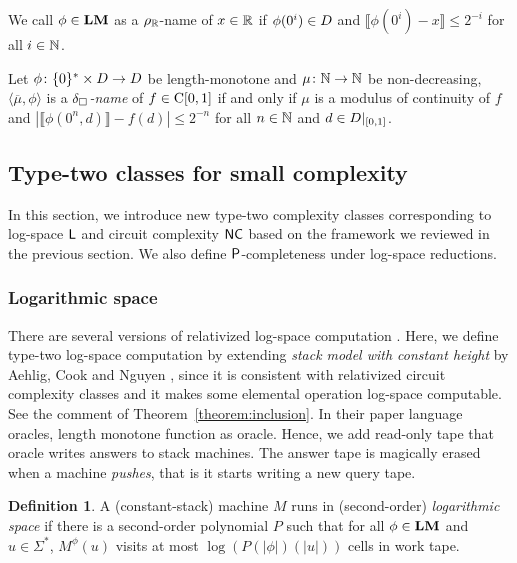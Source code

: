 \documentclass{article}
\theoremstyle{definition}
\newtheorem{definition}[theorem]{Definition}
\theoremstyle{remark}
\begin{document}
We call $\phi \in \mathbf{LM}$ as a $\rho _\mathbb R$-name of $x \in \mathbb R$ 
if $\phi(0^i) \in D$ and $\llbracket \phi(0^i) - x \rrbracket \le 2^{-i}$
for all $i \in \mathbb N$.

Let $\phi \colon \{0\}^* \times D \to D$ be length-monotone and $\mu \colon \mathbb N \to \mathbb N$ be non-decreasing,
$\langle \overline{\mu}, \phi \rangle$ is a {\em $\delta _\square$-name} of $f \in \mathrm C[0,1]$
if and only if $\mu$ is a modulus of continuity of $f$
and $|\llbracket \phi(0^n, d) \rrbracket - f(d)| \le 2^{-n}$ for all $n \in \mathbb N$ and $d \in D|_{[0,1]}$.




\subsection{Type-two classes for small complexity}
\label{section:small-classes}

In this section, we introduce new type-two complexity classes
corresponding to log-space $\mathsf{L}$ and circuit complexity $\mathsf{NC}$
based on the framework we reviewed in the previous section.
We also define $\mathsf{P}$-completeness under log-space reductions.

\subsubsection{Logarithmic space}
There are several versions of relativized log-space computation
\cite{aehlig2007relativizing,buss1988relativized,ladner1976relativization,wilson1988measure, ota2013logspace}.
Here, we define type-two log-space computation 
by extending \emph{stack model with constant height} by Aehlig, Cook and Nguyen 
\cite{aehlig2007relativizing},
since it is consistent with relativized circuit complexity classes 
and it makes some elemental operation log-space computable.
See the comment of Theorem~\ref{theorem:inclusion}.
In their paper language oracles,
 length monotone function as oracle.
Hence, we add read-only tape that oracle writes answers to stack machines.
The answer tape is magically erased when a machine \emph{pushes},
that is it starts writing a new query tape.

\begin{definition}
 A (constant-stack) machine $M$ runs in (second-order) \emph{logarithmic space}
 if there is a second-order polynomial $P$ such that for all $\phi \in \mathbf{LM}$
 and $u \in \Sigma^*$, $M^\phi(u)$ visits at most $\log(P(|\phi|)(|u|))$ cells
 in work tape.
\end{definition}
\end{document}
